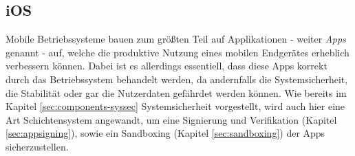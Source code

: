 \subsection{iOS}
	Mobile Betriebssysteme bauen zum größten Teil auf Applikationen - weiter
	\textsl{Apps} genannt - auf, welche die produktive Nutzung eines mobilen
	Endgerätes erheblich verbessern können. Dabei ist es allerdings
	essentiell, dass diese Apps korrekt durch das Betriebssystem behandelt werden,
	da andernfalls die Systemsicherheit, die Stabilität oder gar die Nutzerdaten
	gefährdet werden können. Wie bereits im Kapitel \ref{sec:components-syssec}
	Systemsicherheit vorgestellt, wird auch hier eine Art
	Schichtensystem angewandt, um eine Signierung und Verifikation (Kapitel
	\ref{sec:appsigning}), sowie ein Sandboxing (Kapitel \ref{sec:sandboxing}) der
	Apps sicherzustellen.
	
